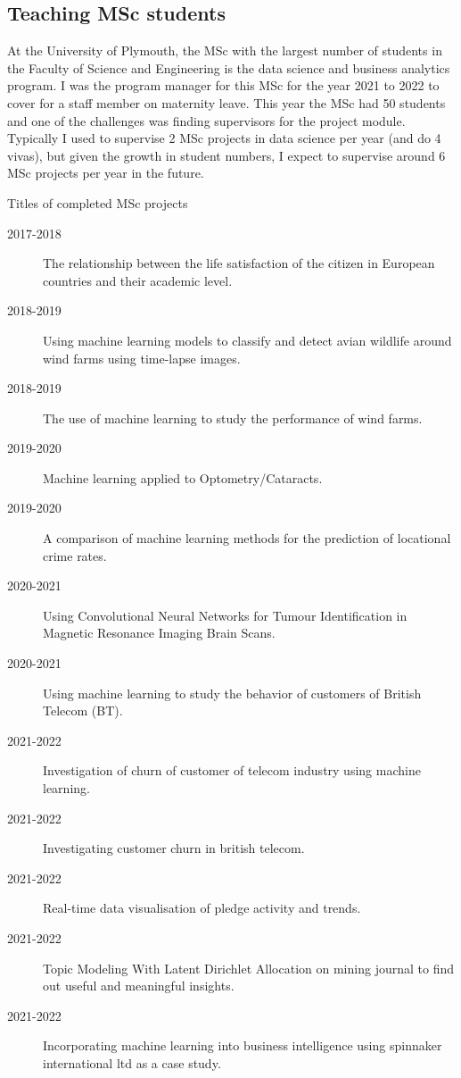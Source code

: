 \documentclass[12pt]{article}
\begin{document}
\subsection{Teaching MSc students}

At the University of Plymouth, the MSc with the largest
number of students in the Faculty of Science and Engineering
is the data science and business analytics program. I was the 
program manager for this MSc for the year 
2021 to 2022 to cover for a staff member
on maternity leave. This year the MSc had 50 students and one
of the challenges was finding supervisors for the project module.
Typically I used to supervise 2 MSc projects in data science per year (and do
4 vivas), but given the growth in student numbers,
I expect to supervise around 6 MSc projects per year in the future.

Titles of completed MSc projects
\begin{description}

\item[2017-2018] The relationship between the life satisfaction of the
citizen in European countries and their academic level.

\item[2018-2019] Using machine learning models to classify and detect
  avian wildlife around wind farms using time-lapse images.

\item[2018-2019] The use of machine learning to study the performance
  of wind farms.

\item[2019-2020] Machine learning applied to Optometry/Cataracts.

\item[2019-2020] A comparison of machine learning methods for the
  prediction of locational crime rates.

\item[2020-2021] Using Convolutional Neural Networks
for Tumour Identification in
Magnetic Resonance Imaging
Brain Scans.


\item[2020-2021] Using machine learning to study the behavior of
  customers of British Telecom (BT). 

\item[2021-2022] Investigation of churn of customer of telecom
  industry using machine learning.


\item[2021-2022] Investigating customer churn in british telecom.

\item[2021-2022] Real-time data visualisation of pledge activity and trends.

\item[2021-2022] Topic Modeling With Latent Dirichlet Allocation on  mining journal to find out useful and meaningful insights.

\item[2021-2022] Incorporating machine learning into business
  intelligence using spinnaker international ltd as a case study.


\end{description}
\end{document}
